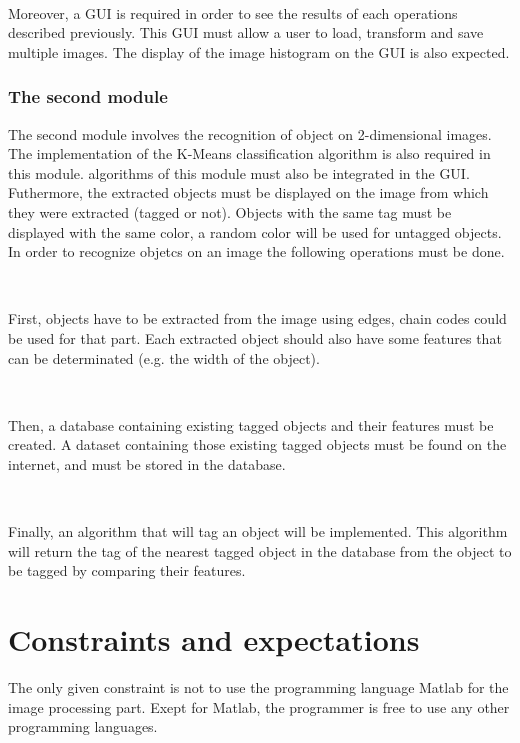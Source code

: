 ~~


Moreover, a \gls{GUI} is required in order to see the results of each operations described previously. This \gls{GUI} must allow a user to load, transform and save multiple images. The display of the image \gls{histogram} on the \gls{GUI} is also expected. 


\subsubsection{The second module}

The second module involves the recognition of object on 2-dimensional images. The implementation of the K-Means classification \gls{algorithm} is also required in this module. \Glspl{algorithm} of this module must also be integrated in the \gls{GUI}. Futhermore, the extracted objects must be displayed on the image from which they were extracted (tagged or not). Objects with the same tag must be displayed with the same color, a random color will be used for untagged objects. In order to recognize objetcs on an image the following operations must be done. 

~~

First, objects have to be extracted from the image using edges, chain codes could be used for that part. Each extracted object should also have some features that can be determinated (e.g. the width of the object). 

~~

Then, a database containing existing tagged objects and their features must be created. A dataset containing those existing tagged objects must be found on the internet, and must be stored in the database. 

~~

Finally, an \gls{algorithm} that will tag an object will be implemented. This \gls{algorithm} will return the tag of the nearest tagged object in the database from the object to be tagged by comparing their features. 

 


\section{Constraints and expectations}


The only given constraint is not to use the programming language Matlab for the image processing part. Exept for Matlab, the programmer is free to use any other programming languages. 

